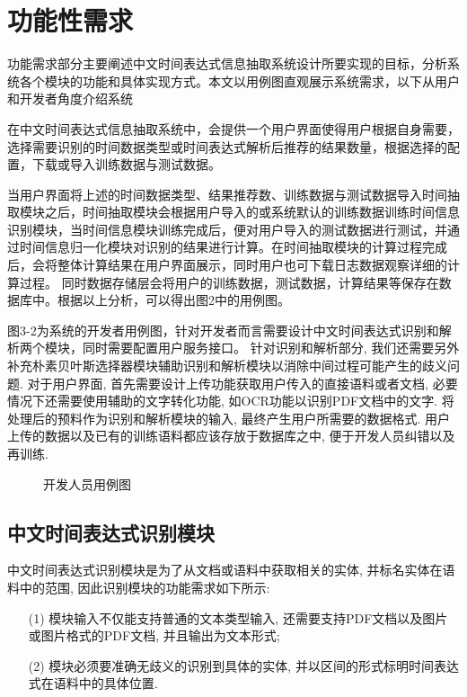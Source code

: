\section{功能性需求}



功能需求部分主要阐述中文时间表达式信息抽取系统设计所要实现的目标，分析系统各个模块的功能和具体实现方式。本文以用例图直观展示系统需求，以下从用户和开发者角度介绍系统

在中文时间表达式信息抽取系统中，会提供一个用户界面使得用户根据自身需要，选择需要识别的时间数据类型或时间表达式解析后推荐的结果数量，根据选择的配置，下载或导入训练数据与测试数据。

当用户界面将上述的时间数据类型、结果推荐数、训练数据与测试数据导入时间抽取模块之后，时间抽取模块会根据用户导入的或系统默认的训练数据训练时间信息识别模块，当时间信息模块训练完成后，便对用户导入的测试数据进行测试，并通过时间信息归一化模块对识别的结果进行计算。在时间抽取模块的计算过程完成后，会将整体计算结果在用户界面展示，同时用户也可下载日志数据观察详细的计算过程。
同时数据存储层会将用户的训练数据，测试数据，计算结果等保存在数据库中。根据以上分析，可以得出图2中的用例图。

图3-2为系统的开发者用例图，针对开发者而言需要设计中文时间表达式识别和解析两个模块，同时需要配置用户服务接口。
针对识别和解析部分, 我们还需要另外补充朴素贝叶斯选择器模块辅助识别和解析模块以消除中间过程可能产生的歧义问题.
对于用户界面, 首先需要设计上传功能获取用户传入的直接语料或者文档, 必要情况下还需要使用辅助的文字转化功能, 如OCR功能以识别PDF文档中的文字.
将处理后的预料作为识别和解析模块的输入, 最终产生用户所需要的数据格式.
用户上传的数据以及已有的训练语料都应该存放于数据库之中, 便于开发人员纠错以及再训练.

\begin{figure}[h]
    \centering
    \caption{开发人员用例图}
    \label{fig:develope_usecase}
\end{figure}

\subsection{中文时间表达式识别模块}

中文时间表达式识别模块是为了从文档或语料中获取相关的实体, 并标名实体在语料中的范围, 因此识别模块的功能需求如下所示:
\begin{enumerate}
    \item[(1)] 模块输入不仅能支持普通的文本类型输入, 还需要支持PDF文档以及图片或图片格式的PDF文档, 并且输出为文本形式;
    \item[(2)] 模块必须要准确无歧义的识别到具体的实体, 并以区间的形式标明时间表达式在语料中的具体位置.
\end{enumerate}

